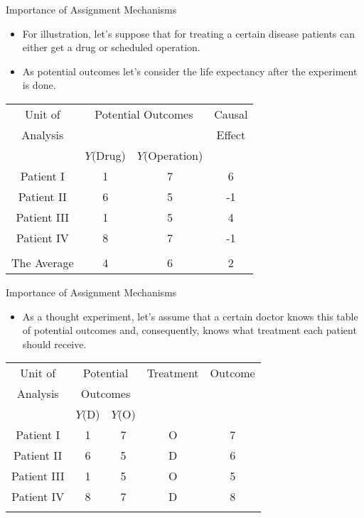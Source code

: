 \documentclass{beamer}
\begin{document}
\begin{frame}{Importance of Assignment Mechanisms}
\begin{itemize}
\item For illustration, let's suppose that for treating a certain disease patients can either get a drug or scheduled operation. 
\item As potential outcomes let's consider the life expectancy after the experiment is done. 
\end{itemize}
\small
\begin{center}
\begin{tabular}{  c  c  c c }
\hline\hline
Unit of & \multicolumn{2}{c}{Potential Outcomes} & Causal \\
Analysis & & & Effect \\
\cline{2-3}
& $Y$(Drug) & $Y$(Operation) & \\
\hline
Patient I & 1 & 7 & 6 \\
Patient II & 6 & 5 & -1 \\
Patient III & 1 & 5 & 4 \\
Patient IV & 8 & 7 & -1 \\
& & & \\
The Average & 4 & 6 & 2 \\
\hline\hline
\end{tabular}
\end{center}
\end{frame}
\begin{frame}{Importance of Assignment Mechanisms}
\begin{itemize}
\item As a thought experiment, let's assume that a certain doctor knows this table of potential outcomes and, consequently, knows what treatment each patient should receive. 
\end{itemize}
\small
\begin{center}
\begin{tabular}{ c c c c c }
\hline\hline
Unit of & \multicolumn{2}{c}{Potential} & Treatment & Outcome \\
Analysis & \multicolumn{2}{c}{Outcomes} & & \\
\cline{2-3}
& $Y$(D) & $Y$(O) & & \\
\hline
Patient I & 1 & 7 & O & 7 \\
Patient II & 6 & 5 & D & 6 \\
Patient III & 1 & 5 & O & 5 \\
Patient IV & 8 & 7 & D & 8 \\
& & & & \\
\hline\hline
\end{tabular}
\end{center}
\end{frame}
\end{document}

